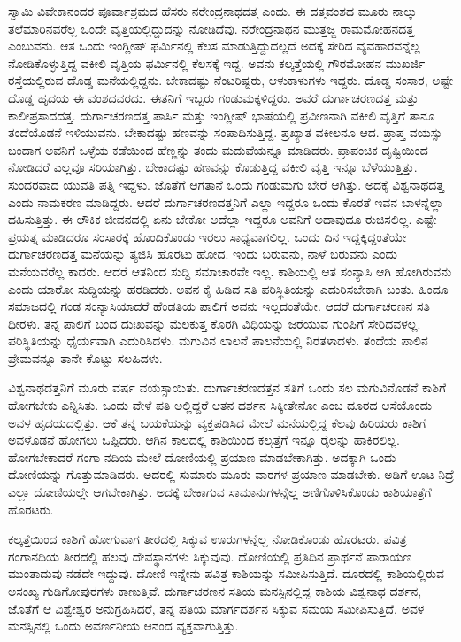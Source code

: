 ಸ್ವಾಮಿ ವಿವೇಕಾನಂದರ ಪೂರ್ವಾಶ್ರಮದ ಹೆಸರು ನರೇಂದ್ರನಾಥದತ್ತ ಎಂದು. ಈ ದತ್ತವಂಶದ ಮೂರು ನಾಲ್ಕು ತಲೆಮಾರಿನವರೆಲ್ಲ ಒಂದೇ ವೃತ್ತಿಯಲ್ಲಿದ್ದುದನ್ನು ನೋಡಿದೆವು. ನರೇಂದ್ರನಾಥನ ಮುತ್ತಜ್ಜ ರಾಮಮೋಹನದತ್ತ ಎಂಬುವನು. ಆತ ಒಂದು ಇಂಗ್ಲೀಷ್ ಫರ್ಮಿನಲ್ಲಿ ಕೆಲಸ ಮಾಡುತ್ತಿದ್ದುದಲ್ಲದೆ ಅದಕ್ಕೆ ಸೇರಿದ ವ್ಯವಹಾರವನ್ನೆಲ್ಲ ನೋಡಿಕೊಳ್ಳುತ್ತಿದ್ದ ವಕೀಲಿ ವೃತ್ತಿಯ ಫರ್ಮಿನಲ್ಲಿ ಕೆಲಸಕ್ಕೆ ಇದ್ದ. ಅವನು ಕಲ್ಕತ್ತೆಯಲ್ಲಿ ಗೌರಮೋಹನ ಮುಖರ್ಜಿ ರಸ್ತೆಯಲ್ಲಿರುವ ದೊಡ್ಡ ಮನೆಯಲ್ಲಿದ್ದನು. ಬೇಕಾದಷ್ಟು ನೆಂಟರಿಷ್ಟರು, ಆಳುಕಾಳುಗಳು ಇದ್ದರು. ದೊಡ್ಡ ಸಂಸಾರ, ಅಷ್ಟೇ ದೊಡ್ಡ ಹೃದಯ ಈ ವಂಶದವರದು. ಈತನಿಗೆ ಇಬ್ಬರು ಗಂಡುಮಕ್ಕಳಿದ್ದರು. ಅವರೆ ದುರ್ಗಾಚರಣದತ್ತ ಮತ್ತು ಕಾಲೀಪ್ರಸಾದದತ್ತ. ದುರ್ಗಾಚರಣದತ್ತ ಪಾರ್ಸಿ ಮತ್ತು ಇಂಗ್ಲೀಷ್ ಭಾಷೆಯಲ್ಲಿ ಪ್ರವೀಣನಾಗಿ ವಕೀಲಿ ವೃತ್ತಿಗೆ ತಾನೂ ತಂದೆಯೊಡನೆ ಇಳಿಯುವನು. ಬೇಕಾದಷ್ಟು ಹಣವನ್ನು ಸಂಪಾದಿಸುತ್ತಿದ್ದ. ಪ್ರಖ್ಯಾತ ವಕೀಲನೂ ಆದ. ಪ್ರಾಪ್ತ ವಯಸ್ಸು ಬಂದಾಗ ಅವನಿಗೆ ಒಳ್ಳೆಯ ಕಡೆಯಿಂದ ಹೆಣ್ಣನ್ನು ತಂದು ಮದುವೆಯನ್ನೂ ಮಾಡಿದರು. ಪ್ರಾಪಂಚಿಕ ದೃಷ್ಟಿಯಿಂದ ನೋಡಿದರೆ ಎಲ್ಲವೂ ಸರಿಯಾಗಿತ್ತು. ಬೇಕಾದಷ್ಟು ಹಣವನ್ನು ಕೊಡುತ್ತಿದ್ದ ವಕೀಲಿ ವೃತ್ತಿ ಇನ್ನೂ ಬೆಳೆಯುತ್ತಿತ್ತು. ಸುಂದರವಾದ ಯುವತಿ ಪತ್ನಿ ಇದ್ದಳು. ಜೊತೆಗೆ ಆಗತಾನೆ ಒಂದು ಗಂಡುಮಗು ಬೇರೆ ಆಗಿತ್ತು. ಅದಕ್ಕೆ ವಿಶ್ವನಾಥದತ್ತ ಎಂದು ನಾಮಕರಣ ಮಾಡಿದ್ದರು. ಆದರೆ ದುರ್ಗಾಚರಣದತ್ತನಿಗೆ ಎಲ್ಲಾ ಇದ್ದರೂ ಒಂದು ಕೊರತೆ ಇವನ ಬಾಳನ್ನೆಲ್ಲಾ ದಹಿಸುತ್ತಿತ್ತು. ಈ ಲೌಕಿಕ ಜೀವನದಲ್ಲಿ ಏನು ಬೇಕೋ ಅದೆಲ್ಲಾ ಇದ್ದರೂ ಅವನಿಗೆ ಅದಾವುದೂ ರುಚಿಸಲಿಲ್ಲ. ಎಷ್ಟೇ ಪ್ರಯತ್ನ ಮಾಡಿದರೂ ಸಂಸಾರಕ್ಕೆ ಹೊಂದಿಕೊಂಡು ಇರಲು ಸಾಧ್ಯವಾಗಲಿಲ್ಲ. ಒಂದು ದಿನ ಇದ್ದಕ್ಕಿದ್ದಂತೆಯೇ ದುರ್ಗಾಚರಣದತ್ತ ಮನೆಯನ್ನು ತ್ಯಜಿಸಿ ಹೊರಟು ಹೋದ. ಇಂದು ಬರುವನು, ನಾಳೆ ಬರುವನು ಎಂದು ಮನೆಯವರೆಲ್ಲ ಕಾದರು. ಆದರೆ ಆತನಿಂದ ಸುದ್ದಿ ಸಮಾಚಾರವೇ ಇಲ್ಲ. ಕಾಶಿಯಲ್ಲಿ ಆತ ಸಂನ್ಯಾಸಿ ಆಗಿ ಹೋಗಿರುವನು ಎಂದು ಯಾರೋ ಸುದ್ದಿಯನ್ನು ಹರಡಿದರು. ಅವನ ಕೈ ಹಿಡಿದ ಸತಿ ಪರಿಸ್ಥಿತಿಯನ್ನು ಎದುರಿಸಬೇಕಾಗಿ ಬಂತು. ಹಿಂದೂ ಸಮಾಜದಲ್ಲಿ ಗಂಡ ಸಂನ್ಯಾಸಿಯಾದರೆ ಹೆಂಡತಿಯ ಪಾಲಿಗೆ ಅವನು ಇಲ್ಲದಂತೆಯೇ. ಆದರೆ ದುರ್ಗಾಚರಣನ ಸತಿ ಧೀರಳು. ತನ್ನ ಪಾಲಿಗೆ ಬಂದ ದುಃಖವನ್ನು ಮೆಲಕುತ್ತ ಕೊರಗಿ ವಿಧಿಯನ್ನು ಜರೆಯುವ ಗುಂಪಿಗೆ ಸೇರಿದವಳಲ್ಲ. ಪರಿಸ್ಥಿತಿಯನ್ನು ಧೈರ್ಯವಾಗಿ ಎದುರಿಸಿದಳು. ಮಗುವಿನ ಲಾಲನೆ ಪಾಲನೆಯಲ್ಲಿ ನಿರತಳಾದಳು. ತಂದೆಯ ಪಾಲಿನ ಪ್ರೇಮವನ್ನೂ ತಾನೇ ಕೊಟ್ಟು ಸಲಹಿದಳು.

ವಿಶ್ವನಾಥದತ್ತನಿಗೆ ಮೂರು ವರ್ಷ ವಯಸ್ಸಾಯಿತು. ದುರ್ಗಾಚರಣದತ್ತನ ಸತಿಗೆ ಒಂದು ಸಲ ಮಗುವಿನೊಡನೆ ಕಾಶಿಗೆ ಹೋಗಬೇಕು ಎನ್ನಿಸಿತು. ಒಂದು ವೇಳೆ ಪತಿ ಅಲ್ಲಿದ್ದರೆ ಆತನ ದರ್ಶನ ಸಿಕ್ಕೀತೇನೋ ಎಂಬ ದೂರದ ಆಸೆಯೊಂದು ಅವಳ ಹೃದಯದಲ್ಲಿತ್ತು. ಆಕೆ ತನ್ನ ಬಯಕೆಯನ್ನು ವ್ಯಕ್ತಪಡಿಸಿದ ಮೇಲೆ ಮನೆಯಲ್ಲಿದ್ದ ಕೆಲವು ಹಿರಿಯರು ಕಾಶಿಗೆ ಅವಳೊಡನೆ ಹೋಗಲು ಒಪ್ಪಿದರು. ಆಗಿನ ಕಾಲದಲ್ಲಿ ಕಾಶಿಯಿಂದ ಕಲ್ಕತ್ತೆಗೆ ಇನ್ನೂ ರೈಲನ್ನು ಹಾಕಿರಲಿಲ್ಲ. ಹೋಗಬೇಕಾದರೆ ಗಂಗಾ ನದಿಯ ಮೇಲೆ ದೋಣಿಯಲ್ಲಿ ಪ್ರಯಾಣ ಮಾಡಬೇಕಾಗಿತ್ತು. ಅದಕ್ಕಾಗಿ ಒಂದು ದೋಣಿಯನ್ನು ಗೊತ್ತುಮಾಡಿದರು. ಅದರಲ್ಲಿ ಸುಮಾರು ಮೂರು ವಾರಗಳ ಪ್ರಯಾಣ ಮಾಡಬೇಕು. ಅಡಿಗೆ ಊಟ ನಿದ್ರೆ ಎಲ್ಲಾ ದೋಣಿಯಲ್ಲೇ ಆಗಬೇಕಾಗಿತ್ತು. ಅದಕ್ಕೆ ಬೇಕಾಗುವ ಸಾಮಾನುಗಳನ್ನೆಲ್ಲ ಅಣಿಗೊಳಿಸಿಕೊಂಡು ಕಾಶಿಯಾತ್ರೆಗೆ ಹೊರಟರು.

ಕಲ್ಕತ್ತೆಯಿಂದ ಕಾಶಿಗೆ ಹೋಗುವಾಗ ತೀರದಲ್ಲಿ ಸಿಕ್ಕುವ ಊರುಗಳನ್ನೆಲ್ಲ ನೋಡಿಕೊಂಡು ಹೊರಟರು. ಪವಿತ್ರ ಗಂಗಾನದಿಯ ತೀರದಲ್ಲಿ ಹಲವು ದೇವಸ್ಥಾನಗಳು ಸಿಕ್ಕುವುವು. ದೋಣಿಯಲ್ಲಿ ಪ್ರತಿದಿನ ಪ್ರಾರ್ಥನೆ ಪಾರಾಯಣ ಮುಂತಾದುವು ನಡೆದೇ ಇದ್ದುವು. ದೋಣಿ ಇನ್ನೇನು ಪವಿತ್ರ ಕಾಶಿಯನ್ನು ಸಮೀಪಿಸುತ್ತಿದೆ. ದೂರದಲ್ಲಿ ಕಾಶಿಯಲ್ಲಿರುವ ಅಸಂಖ್ಯ ಗುಡಿಗೋಪುರಗಳು ಕಾಣುತ್ತಿವೆ. ದುರ್ಗಾಚರಣನ ಸತಿಯ ಮನಸ್ಸಿನಲ್ಲಿದ್ದ ಕಾಶಿಯ ವಿಶ್ವನಾಥ ದರ್ಶನ, ಜೊತೆಗೆ ಆ ವಿಶ್ವೇಶ್ವರ ಅನುಗ್ರಹಿಸಿದರೆ, ತನ್ನ ಪತಿಯ ಮಾರ್ಗದರ್ಶನ ಸಿಕ್ಕುವ ಸಮಯ ಸಮೀಪಿಸುತ್ತಿದೆ. ಅವಳ ಮನಸ್ಸಿನಲ್ಲಿ ಒಂದು ಅವರ್ಣನೀಯ ಆನಂದ ವ್ಯಕ್ತವಾಗುತ್ತಿತ್ತು.


